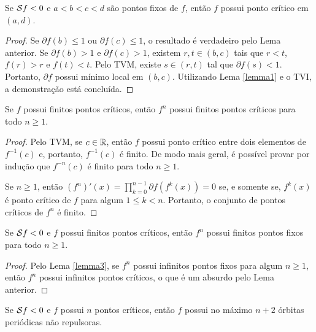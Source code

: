 \begin{lemma}
\label{lemma3}
Se $\mathcal{S} f < 0$ e $a<b<c<d$ são pontos fixos de $f$, então $f$ possui ponto crítico em $(a,d)$.
\end{lemma}

\begin{proof}
Se $\partial f(b) \leq 1$ ou $\partial f(c) \leq 1$, o resultado é verdadeiro pelo Lema anterior. Se $\partial f(b) > 1$ e $\partial f(c) > 1$, existem $r, t \in (b,c)$ tais que $r<t$, $f(r) > r$ e $f(t) < t$. Pelo TVM, existe $s \in (r,t)$ tal que $\partial f(s) < 1$. Portanto, $\partial f$ possui mínimo local em $(b,c)$. Utilizando Lema \ref{lemma1} e o TVI, a demonstração está concluída.
\end{proof}

\begin{lemma}
Se $f$ possui finitos pontos críticos, então $f^n$ possui finitos pontos críticos para todo $n \geq 1$.
\end{lemma}
\begin{proof}
Pelo TVM, se $c \in \mathbb{R}$, então $f$ possui ponto crítico entre dois elementos de $f^{-1}(c)$ e, portanto, $f^{-1}(c)$ é finito.
De modo mais geral, é possível provar por indução que $f^{-n}(c)$ é finito para todo $n \geq 1$.

Se $n \geq 1$, então $(f^n)'(x) = \prod_{k=0}^{n-1} \partial f(f^k(x)) = 0$ se, e somente se, $f^k(x)$ é ponto crítico de $f$ para algum $1 \leq k < n$.
Portanto, o conjunto de pontos críticos de $f^n$ é finito.
\end{proof}

\begin{lemma}
Se $\mathcal{S} f < 0$ e $f$ possui finitos pontos críticos, então $f^n$ possui finitos pontos fixos para todo $n \geq 1$.
\end{lemma}

\begin{proof}
Pelo Lema \ref{lemma3}, se $f^n$ possui infinitos pontos fixos para algum $n \geq 1$, então $f^n$ possui infinitos pontos críticos, o que é um absurdo pelo Lema anterior.
\end{proof}

\begin{theorem}[Singer]
Se $\mathcal{S} f < 0$ e $f$ possui $n$ pontos críticos, então $f$ possui no máximo $n+2$ órbitas periódicas não repulsoras.
\end{theorem}

